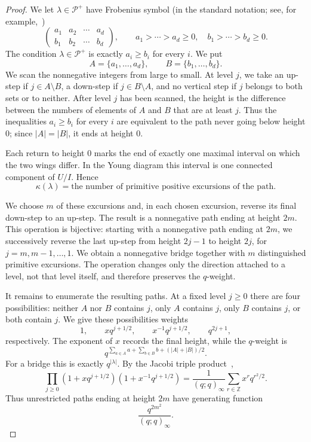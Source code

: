 \documentclass[11pt]{article}
\theoremstyle{definition}
\theoremstyle{remark}
\begin{document}
\begin{proof}
We let $\lambda\in\mathcal P^+$ have Frobenius symbol (in the standard notation; see, for example,~\cite[Chapter~1]{AndrewsPartitions})
\[
 \begin{pmatrix}
  a_1&a_2&\cdots&a_d\\
  b_1&b_2&\cdots&b_d
 \end{pmatrix},
 \qquad
 a_1>\cdots>a_d\geq0,
 \quad
 b_1>\cdots>b_d\geq0.
\]
The condition $\lambda\in\mathcal P^+$ is exactly $a_i\geq b_i$ for every $i$.  We put
\[
 A=\{a_1,\ldots,a_d\},
 \qquad
 B=\{b_1,\ldots,b_d\}.
\]
We scan the nonnegative integers from large to small.  At level $j$, we take an up-step if $j\in A\setminus B$, a down-step if $j\in B\setminus A$, and no vertical step if $j$ belongs to both sets or to neither.  After level $j$ has been scanned, the height is the difference between the numbers of elements of $A$ and $B$ that are at least $j$.  Thus the inequalities $a_i\geq b_i$ for every $i$ are equivalent to the path never going below height $0$; since $|A|=|B|$, it ends at height $0$.

Each return to height $0$ marks the end of exactly one maximal interval on which the two wings differ.  In the Young diagram this interval is one connected component of $U/I$.  Hence
\begin{equation}\label{eq:blocks-excursions}
 \kappa(\lambda)
 =\text{the number of primitive positive excursions of the path}.
\end{equation}

We choose $m$ of these excursions and, in each chosen excursion, reverse its final down-step to an up-step.  The result is a nonnegative path ending at height $2m$.  This operation is bijective: starting with a nonnegative path ending at $2m$, we successively reverse the last up-step from height $2j-1$ to height $2j$, for $j=m,m-1,\ldots,1$.  We obtain a nonnegative bridge together with $m$ distinguished primitive excursions.  The operation changes only the direction attached to a level, not that level itself, and therefore preserves the $q$-weight.

It remains to enumerate the resulting paths.  At a fixed level $j\geq0$ there are four possibilities: neither $A$ nor $B$ contains $j$, only $A$ contains $j$, only $B$ contains $j$, or both contain $j$.  We give these possibilities weights
\[
 1,
 \qquad xq^{j+1/2},
 \qquad x^{-1}q^{j+1/2},
 \qquad q^{2j+1},
\]
respectively.  The exponent of $x$ records the final height, while the $q$-weight is
\[
 q^{\sum_{a\in A}a+\sum_{b\in B}b+(|A|+|B|)/2}.
\]
For a bridge this is exactly $q^{|\lambda|}$.  By the Jacobi triple product~\cite[Chapter~2]{AndrewsPartitions},
\begin{equation}\label{eq:triple-path}
 \prod_{j\geq0}
 (1+xq^{j+1/2})(1+x^{-1}q^{j+1/2})
 =\frac{1}{(q;q)_\infty}
 \sum_{r\in\mathbb Z}x^rq^{r^2/2}.
\end{equation}
Thus unrestricted paths ending at height $2m$ have generating function
\[
 \frac{q^{2m^2}}{(q;q)_\infty}.
\]


\end{proof}
\end{document}
